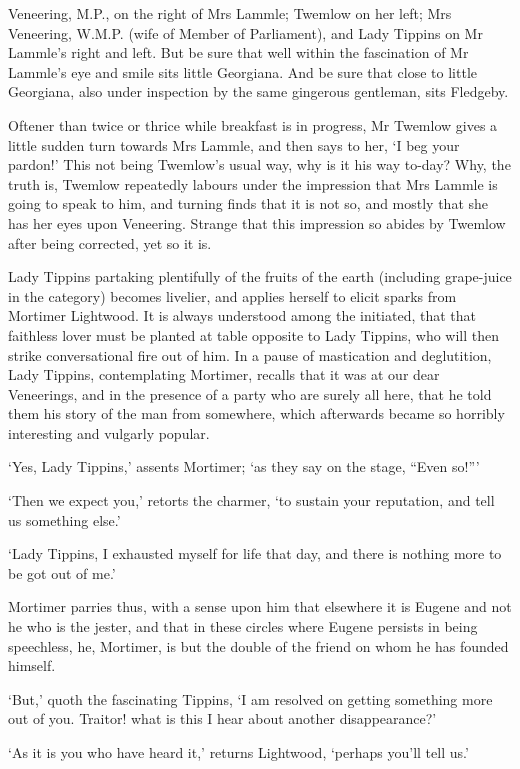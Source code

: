 Veneering, M.P., on the right of Mrs Lammle; Twemlow on her left; Mrs
Veneering, W.M.P. (wife of Member of Parliament), and Lady Tippins on Mr
Lammle’s right and left. But be sure that well within the fascination of
Mr Lammle’s eye and smile sits little Georgiana. And be sure that
close to little Georgiana, also under inspection by the same gingerous
gentleman, sits Fledgeby.

Oftener than twice or thrice while breakfast is in progress, Mr Twemlow
gives a little sudden turn towards Mrs Lammle, and then says to her, ‘I
beg your pardon!’ This not being Twemlow’s usual way, why is it his
way to-day? Why, the truth is, Twemlow repeatedly labours under the
impression that Mrs Lammle is going to speak to him, and turning finds
that it is not so, and mostly that she has her eyes upon Veneering.
Strange that this impression so abides by Twemlow after being corrected,
yet so it is.

Lady Tippins partaking plentifully of the fruits of the earth (including
grape-juice in the category) becomes livelier, and applies herself to
elicit sparks from Mortimer Lightwood. It is always understood among the
initiated, that that faithless lover must be planted at table opposite
to Lady Tippins, who will then strike conversational fire out of him.
In a pause of mastication and deglutition, Lady Tippins, contemplating
Mortimer, recalls that it was at our dear Veneerings, and in the
presence of a party who are surely all here, that he told them his
story of the man from somewhere, which afterwards became so horribly
interesting and vulgarly popular.

‘Yes, Lady Tippins,’ assents Mortimer; ‘as they say on the stage, “Even
so!”’

‘Then we expect you,’ retorts the charmer, ‘to sustain your reputation,
and tell us something else.’

‘Lady Tippins, I exhausted myself for life that day, and there is
nothing more to be got out of me.’

Mortimer parries thus, with a sense upon him that elsewhere it is Eugene
and not he who is the jester, and that in these circles where Eugene
persists in being speechless, he, Mortimer, is but the double of the
friend on whom he has founded himself.

‘But,’ quoth the fascinating Tippins, ‘I am resolved on getting
something more out of you. Traitor! what is this I hear about another
disappearance?’

‘As it is you who have heard it,’ returns Lightwood, ‘perhaps you’ll
tell us.’

